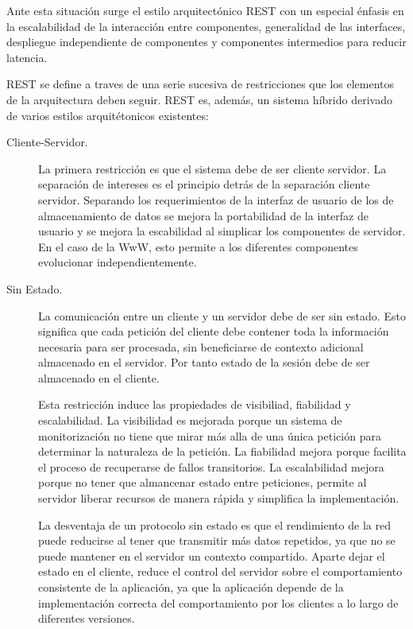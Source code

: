 Ante esta situación surge el estilo arquitectónico REST con un
especial énfasis en la escalabilidad de la interacción entre
componentes, generalidad de las interfaces, despliegue independiente
de componentes y componentes intermedios para reducir latencia.

REST se define a traves de una serie sucesiva de restricciones que los
elementos de la arquitectura deben seguir. REST es, además, un sistema
híbrido derivado de varios estilos arquitétonicos existentes:

\begin{description}

\item[Cliente-Servidor.] La primera restricción es que el sistema debe
  de ser cliente servidor. La separación de intereses es el principio
  detrás de la separación cliente servidor. Separando los
  requerimientos de la interfaz de usuario de los de almacenamiento de
  datos se mejora la portabilidad de la interfaz de usuario y se
  mejora la escabilidad al simplicar los componentes de servidor. En
  el caso de la WwW, esto permite a los diferentes componentes
  evolucionar independientemente.

\item[Sin Estado.] La comunicación entre un cliente y un servidor debe
  de ser sin estado. Esto significa que cada petición del cliente debe
  contener toda la información necesaria para ser procesada, sin
  beneficiarse de contexto adicional almacenado en el servidor. Por
  tanto estado de la sesión debe de ser almacenado en el cliente.

  Esta restricción induce las propiedades de visibiliad, fiabilidad y
  escalabilidad. La visibilidad es mejorada porque un sistema de
  monitorización no tiene que mirar más alla de una única petición
  para determinar la naturaleza de la petición. La fiabilidad mejora
  porque facilita el proceso de recuperarse de fallos transitorios. La
  escalabilidad mejora porque no tener que almancenar estado entre
  peticiones, permite al servidor liberar recursos de manera rápida y
  simplifica la implementación.

  La desventaja de un protocolo sin estado es que el rendimiento de la
  red puede reducirse al tener que transmitir más datos repetidos, ya
  que no se puede mantener en el servidor un contexto
  compartido. Aparte dejar el estado en el cliente, reduce el control
  del servidor sobre el comportamiento consistente de la aplicación,
  ya que la aplicación depende de la implementación correcta del
  comportamiento por los clientes a lo largo de diferentes versiones.


\end{description}
